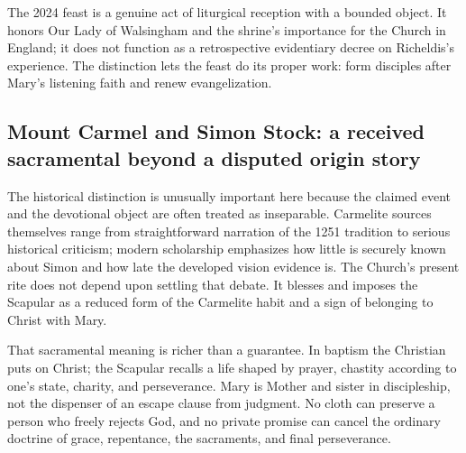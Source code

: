 The 2024 feast is a genuine act of liturgical reception with a bounded object. It honors Our Lady of Walsingham and the shrine's importance for the Church in England; it does not function as a retrospective evidentiary decree on Richeldis's experience. The distinction lets the feast do its proper work: form disciples after Mary's listening faith and renew evangelization.

\subsection{Mount Carmel and Simon Stock: a received sacramental beyond a disputed origin story}


The historical distinction is unusually important here because the claimed event and the devotional object are often treated as inseparable. Carmelite sources themselves range from straightforward narration of the 1251 tradition to serious historical criticism; modern scholarship emphasizes how little is securely known about Simon and how late the developed vision evidence is. The Church's present rite does not depend upon settling that debate. It blesses and imposes the Scapular as a reduced form of the Carmelite habit and a sign of belonging to Christ with Mary.

That sacramental meaning is richer than a guarantee. In baptism the Christian puts on Christ; the Scapular recalls a life shaped by prayer, chastity according to one's state, charity, and perseverance. Mary is Mother and sister in discipleship, not the dispenser of an escape clause from judgment. No cloth can preserve a person who freely rejects God, and no private promise can cancel the ordinary doctrine of grace, repentance, the sacraments, and final perseverance.

